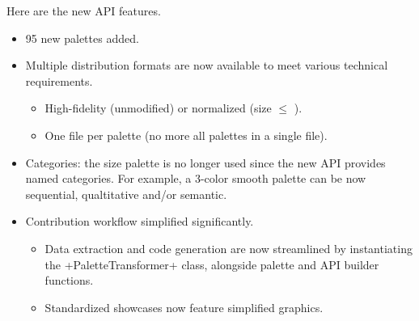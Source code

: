 \documentclass{tutodoc}
\begin{document}


\begin{tdocnew}
    \item Here are the new API features.
    \begin{itemize}
        \item 95 new palettes added.


        \item Multiple distribution formats are now available to meet various technical requirements.
        \begin{itemize}
            \item High-fidelity (unmodified) or normalized (size $\leq$ \palMaxSemSize).

            \item One file per palette (no more all palettes in a single file).
        \end{itemize}


        \item Categories: the size palette is no longer used since the new API provides named categories. For example, a 3-color smooth palette can be now sequential, qualtitative and/or semantic.


        \item Contribution workflow simplified significantly.
        \begin{itemize}
            \item Data extraction and code generation are now streamlined by instantiating the +PaletteTransformer+ class, alongside palette and API builder functions.

            \item Standardized showcases now feature simplified graphics.
        \end{itemize}
    \end{itemize}
\end{tdocnew}


\end{document}

